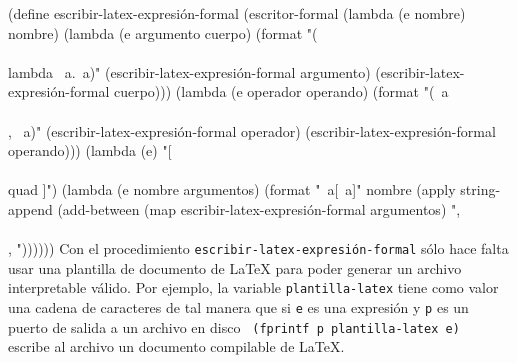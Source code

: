 \documentclass[10pt,oneside,openany,letterpaper]{book}
\begin{document}
\nwenddocs{}\endmoddef
(define escribir-latex-expresión-formal
  (escritor-formal
   (lambda (e nombre) nombre)
   (lambda (e argumento cuerpo)
     (format "(\\\\lambda ~a.~a)"
             (escribir-latex-expresión-formal argumento)
             (escribir-latex-expresión-formal cuerpo)))
   (lambda (e operador operando)
     (format "(~a\\\\, ~a)"
             (escribir-latex-expresión-formal operador)
             (escribir-latex-expresión-formal operando)))
   (lambda (e) "[\\\\quad ]")
   (lambda (e nombre argumentos)
     (format "~a[~a]" nombre
             (apply string-append
                    (add-between (map escribir-latex-expresión-formal
                                      argumentos)
                                 ",\\\\, "))))))
\eatline
{}\nwendcode{}\nwdocspar
Con el procedimiento {\tt{}\protect{}escribir-latex-expresión-formal} sólo hace falta usar una plantilla de documento de \LaTeX{} para poder generar un archivo interpretable válido. Por ejemplo, la variable {\tt{}\protect{}plantilla-latex} tiene como valor una cadena de caracteres de tal manera que si {\tt{}e} es una expresión y {\tt{}p} es un puerto de salida a un archivo en disco
{\tt{}\nwnewline
(fprintf\ p\ \protect{}plantilla-latex\ e)\nwnewline
}
escribe al archivo un documento compilable de \LaTeX{}.
\end{document}
